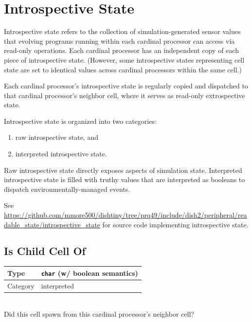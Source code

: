 \newcommand{\instrospectivestatedef}[2]{
    \begin{tabular}{|
        >{\columncolor[HTML]{C0C0C0}}l |l|}
        \hline
        Type & #1 \\ \hline
        Category & #2 \\ \hline
    \end{tabular} \\
}

\section{Introspective State}

Introspective state refers to the collection of simulation-generated sensor values that evolving programs running within each cardinal processor can access via read-only operations.
Each cardinal processor has an independent copy of each piece of introspective state.
(However, some introspective states representing cell state are set to identical values across cardinal processors within the same cell.)

Each cardinal processor's introspective state is regularly copied and dispatched to that cardinal processor's neighbor cell, where it serves as read-only extrospective state.

Introspective state is organized into two categories:
\begin{enumerate}
    \item raw introspective state, and
    \item interpreted introspective state.
\end{enumerate}

Raw introspective state directly exposes aspects of simulation state.
Interpreted introspective state is filled with truthy values that are interpreted as booleans to dispatch environmentally-managed events.

See \url{https://github.com/mmore500/dishtiny/tree/prq49/include/dish2/peripheral/readable_state/introspective_state} for source code implementing introspective state.

\subsection{Is Child Cell Of}

\instrospectivestatedef{\texttt{char} (w/ boolean semantics)}{interpreted}

Did this cell spawn from this cardinal processor's neighbor cell?

